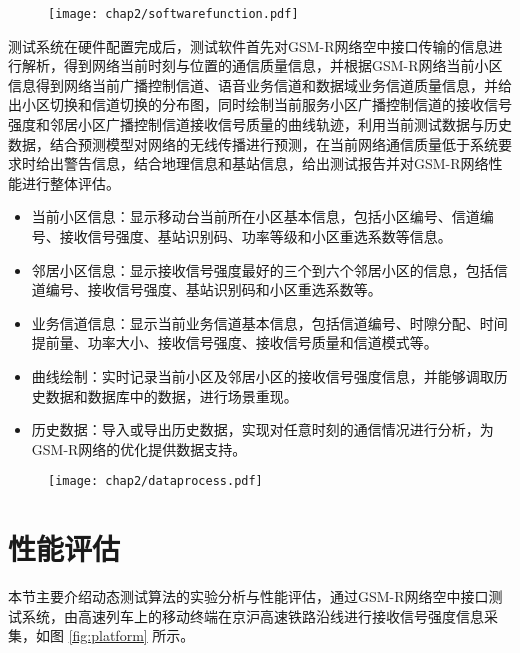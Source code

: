 \begin{figure}[!htp]
\centering
    \texttt{[image: chap2/softwarefunction.pdf]}
\end{figure}

测试系统在硬件配置完成后，测试软件首先对GSM-R网络空中接口传输的信息进行解析，得到网络当前时刻与位置的通信质量信息，并根据GSM-R网络当前小区信息得到网络当前广播控制信道、语音业务信道和数据域业务信道质量信息，并给出小区切换和信道切换的分布图，同时绘制当前服务小区广播控制信道的接收信号强度和邻居小区广播控制信道接收信号质量的曲线轨迹，利用当前测试数据与历史数据，结合预测模型对网络的无线传播进行预测，在当前网络通信质量低于系统要求时给出警告信息，结合地理信息和基站信息，给出测试报告并对GSM-R网络性能进行整体评估。
\begin{itemize}
  \item 当前小区信息：显示移动台当前所在小区基本信息，包括小区编号、信道编号、接收信号强度、基站识别码、功率等级和小区重选系数等信息。
  \item 邻居小区信息：显示接收信号强度最好的三个到六个邻居小区的信息，包括信道编号、接收信号强度、基站识别码和小区重选系数等。
  \item 业务信道信息：显示当前业务信道基本信息，包括信道编号、时隙分配、时间提前量、功率大小、接收信号强度、接收信号质量和信道模式等。
  \item 曲线绘制：实时记录当前小区及邻居小区的接收信号强度信息，并能够调取历史数据和数据库中的数据，进行场景重现。
  \item 历史数据：导入或导出历史数据，实现对任意时刻的通信情况进行分析，为GSM-R网络的优化提供数据支持。
\end{itemize}

\begin{figure}[!htp]
\centering
    \texttt{[image: chap2/dataprocess.pdf]}
\end{figure}


\section{性能评估}
\label{chap:evaluation_phy}

本节主要介绍动态测试算法的实验分析与性能评估，通过GSM-R网络空中接口测试系统，由高速列车上的移动终端在京沪高速铁路沿线进行接收信号强度信息采集，如图 \ref{fig:platform} 所示。

